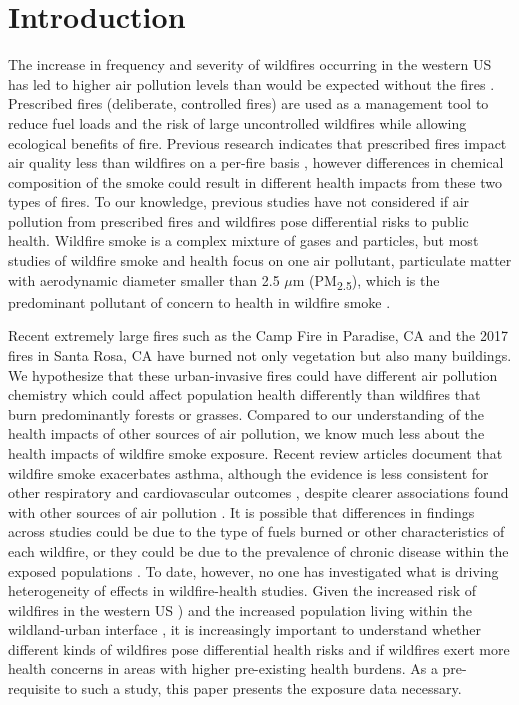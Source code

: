 \section{Introduction}

The increase in frequency and severity of wildfires occurring in the western US \citep{Dennison2014,Steel2014} has led to higher air pollution levels than would be expected without the fires \citep{odell_contribution_2019}. 
Prescribed fires (deliberate, controlled fires) are used as a management tool to reduce fuel loads and the risk of large uncontrolled wildfires while allowing ecological benefits of fire. Previous research indicates that prescribed fires impact air quality less than wildfires on a per-fire basis \citep{Liu2017}, however differences in chemical composition of the smoke could result in different health impacts from these two types of fires. To our knowledge, previous studies have not considered if air pollution from prescribed fires and wildfires pose differential risks to public health. Wildfire smoke is a complex mixture of gases and particles, but most studies of wildfire smoke and health focus on one air pollutant, particulate matter with aerodynamic diameter smaller than 2.5 $\mu \textrm{m}$ (PM\textsubscript{2.5}), which is the predominant pollutant of concern to health in wildfire smoke \citep{sapkota_impact_2005}. 

Recent extremely large fires such as the Camp Fire in Paradise, CA and the 2017 fires in Santa Rosa, CA have burned not only vegetation but also many buildings. We hypothesize that these urban-invasive fires could have different air pollution chemistry which could affect population health differently than wildfires that burn predominantly forests or grasses. Compared to our understanding of the health impacts of other sources of air pollution, we know much less about the health impacts of wildfire smoke exposure. Recent review articles document that wildfire smoke exacerbates asthma, although the evidence is less consistent for other respiratory and cardiovascular outcomes \citep{reid_wildfire_2018,reid_critical_2016, LIU2015120}, despite clearer associations found with other sources of air pollution \citep{Requia_global_2018}. It is possible that differences in findings across studies could be due to the type of fuels burned or other characteristics of each wildfire, or they could be due to the prevalence of chronic disease within the exposed populations \citep{LIU2015120,rappold_peat_2011,tinling_repeating_2016}. To date, however, no one has investigated what is driving heterogeneity of effects in wildfire-health studies. Given the increased risk of wildfires in the western US \citep{westerling_increasing_2016,schoennagel_adapt_2017}) and the increased population living within the wildland-urban interface \citep{radeloff_rapid_2018}, it is increasingly important to understand whether different kinds of wildfires pose differential health risks and if wildfires exert more health concerns in areas with higher pre-existing health burdens. As a pre-requisite to such a study, this paper presents the exposure data necessary.

